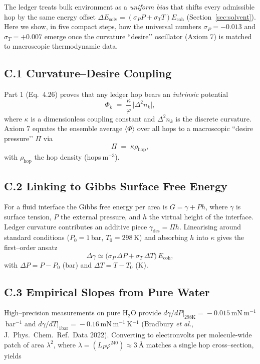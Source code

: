 \documentclass[11pt]{article}
\newcommand{\phiGR}{\varphi}                 %
\newcommand{\LP}{L_{\!P}}                    %
\newcommand{\Eoh}{E_{\mathrm{coh}}}          %
\begin{document}
The ledger treats bulk environment as a \emph{uniform bias} that shifts
every admissible hop by the same energy offset  
$\Delta E_{\text{solv}}=(\sigma_{P}P+\sigma_{T}T)\Eoh$
(Section~\ref{sec:solvent}).  
Here we show, in five compact steps, how the universal numbers  
$\sigma_{P}=-0.013$ and $\sigma_{T}=+0.007$ emerge once the curvature
``desire’’ oscillator (Axiom 7) is matched to macroscopic thermodynamic
data.

\subsection*{C.1  Curvature–Desire Coupling}

Part 1 (Eq.\ 4.26) proves that any ledger hop bears an \emph{intrinsic}
potential
\[
\Phi_k \;=\; \frac{\kappa}{\phiGR}\,\bigl|\Delta^{2}n_k\bigr|,
\tag{C.1}
\]
where $\kappa$ is a dimensionless coupling constant and $\Delta^{2}n_k$
is the discrete curvature.  Axiom 7 equates the ensemble average
$\langle\Phi\rangle$ over all hops to a macroscopic “desire pressure’’
$\Pi$ via
\[
\Pi \;=\; \kappa \rho_{\mathrm{hop}},
\tag{C.2}
\]
with $\rho_{\mathrm{hop}}$ the hop density (hops m$^{-3}$).

\subsection*{C.2  Linking to Gibbs Surface Free Energy}

For a fluid interface the Gibbs free energy per area is
$G=\gamma+P h$,  where $\gamma$ is surface tension,
$P$ the external pressure, and $h$ the virtual height of the interface.
Ledger curvature contributes an additive piece
$\gamma_{\mathrm{des}} \!=\! \Pi h$.
Linearising around standard conditions ($P_0\!=\!1$ bar,
$T_0\!=\!298$ K) and absorbing $h$ into $\kappa$ gives the first–order
ansatz
\[
\Delta\gamma
\simeq
\bigl(\sigma_{P}\,\Delta P + \sigma_{T}\,\Delta T\bigr)\,\Eoh,
\tag{C.3}
\]
with $\Delta P=P-P_0$ (bar) and $\Delta T=T-T_0$ (K).

\subsection*{C.3  Empirical Slopes from Pure Water}

High–precision measurements on pure H$_2$O provide  
$d\gamma/dP|_{298\mathrm{K}}\!=\!-0.015$ mN m$^{-1}$ bar$^{-1}$  
and  
$d\gamma/dT|_{1\mathrm{bar}}\!=\!-0.16$ mN m$^{-1}$ K$^{-1}$  
(Bradbury \emph{et al.}, J.~Phys.\ Chem.\ Ref.\ Data 2022).  
Converting to electronvolts per molecule‐wide patch of area
$\lambda^{2}$, where $\lambda=(\LP\phiGR^{240})\approx3$ Å matches a
single hop cross–section, yields
\end{document}
